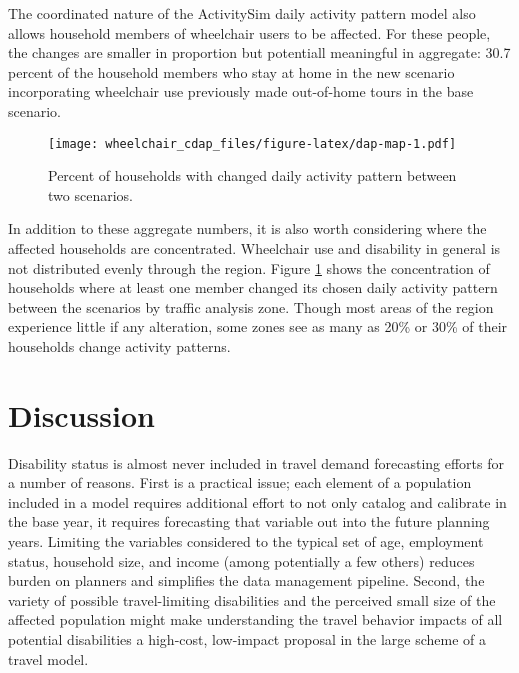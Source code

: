 \documentclass[3p, authoryear, review]{elsarticle} %
\begin{document}
The coordinated nature of the ActivitySim daily activity pattern model also allows
household members of wheelchair users to be affected. For these people,
the changes are smaller in proportion but potentiall meaningful in aggregate:
30.7 percent of the household members who stay at home in the new scenario
incorporating wheelchair use previously made out-of-home tours in the base scenario.

\begin{figure}
\centering
\texttt{[image: wheelchair\_cdap\_files/figure-latex/dap-map-1.pdf]}
\caption{\label{fig:dap-map}Percent of households with changed daily activity pattern between two scenarios.}
\end{figure}

In addition to these aggregate numbers, it is also worth considering where the
affected households are concentrated. Wheelchair use and disability in general
is not distributed evenly through the region. Figure \ref{fig:dap-map} shows the
concentration of households where at least one member changed its chosen
daily activity pattern between the scenarios by traffic analysis zone. Though
most areas of the region experience little if any alteration, some zones see as
many as 20\% or 30\% of their households change activity patterns.

\hypertarget{discussion}{%
\section{Discussion}\label{discussion}}

Disability status is almost never included in travel demand forecasting
efforts for a number of reasons. First is a practical issue; each element
of a population included in a model requires additional effort to not only catalog
and calibrate in the base year, it requires forecasting that variable out into
the future planning years. Limiting the variables considered to the typical set
of age, employment status, household size, and income (among potentially a few
others) reduces burden on planners and simplifies the data management pipeline.
Second, the variety of possible travel-limiting disabilities and the perceived
small size of the affected population might make understanding the travel
behavior impacts of all potential disabilities a high-cost, low-impact proposal
in the large scheme of a travel model.
\end{document}

